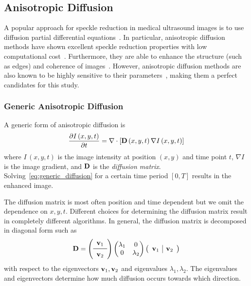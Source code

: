 \subsection{Anisotropic Diffusion}
A popular approach for speckle reduction in medical ultrasound images is to use diffusion partial differential equations~\cite{perona_scalespace_1990, weickert_anisotropic_1998}.
In particular, anisotropic diffusion methods have shown excellent speckle reduction properties with low computational cost~\cite{finn_echocardiographic_2011}.
Furthermore, they are able to enhance the structure (such as edges) and coherence of images~\cite{abd-elmoniem_realtime_2002, kang_new_2016}.
However, anisotropic diffusion methods are also known to be highly sensitive to their parameters~\cite{duarte-salazar_speckle_2020}, making them a perfect candidates for this study.


\subsubsection{Generic Anisotropic Diffusion}
A generic form of anisotropic diffusion is
\begin{align}
  \frac{\partial I\,(x, y, t)}{\partial t} = \nabla \cdot [ \mathbf{D}\,(x, y, t) \, \nabla I\,(x, y, t) ] \label{eq:generic_diffusion}
\end{align}
where \(I\,(x, y, t)\) is the image intensity at position \((x, y)\) and time point \(t\), \(\nabla I\) is the image gradient, and \(\mathbf{D}\) is the \textit{diffusion matrix}.
Solving~\eqref{eq:generic_diffusion} for a certain time period \([0, T]\) results in the enhanced image.

The diffusion matrix is most often position and time dependent but we omit the dependence on \(x, y, t\).
Different choices for determining the diffusion matrix result in completely different algorithms.
In general, the diffusion matrix is decomposed in diagonal form such as
\begin{align}
  \mD = 
  \left(
  \begin{array}{cc}
    \vv_1 \\
    \midrule
    \vv_2
  \end{array}
  \right)
  \begin{pmatrix}
    \lambda_1 & 0 \\
    0 & \lambda_2
  \end{pmatrix}
  \left(
  \begin{array}{c|c}
       \vv_1 & \vv_2
  \end{array}
  \right)
\end{align}
with respect to the eigenvectors \(\mathbf{v}_1, \mathbf{v}_2\) and eigenvalues \(\lambda_1, \lambda_2\).
The eigenvalues and eigenvectors determine how much diffusion occurs towards which direction.

